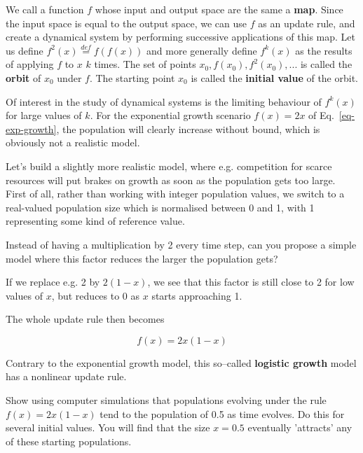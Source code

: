 
We call a function $f$ whose input and output space are the same a \textbf{map}. Since the input space is equal to the output space, we can use $f$ as an update rule, and create a dynamical system by performing successive applications of this map. Let us define $f^2(x) \stackrel{def}{=} f(f(x))$ and more generally define $f^k(x)$ as the results of applying $f$ to $x$ $k$ times. \noindent{} The set of points ${x_0, f(x_0), f^2(x_0), ...}$ is called the \textbf{orbit} of $x_0$ under $f$. The starting point $x_0$ is called the \textbf{initial value} of the orbit.

Of interest in the study of dynamical systems is the limiting behaviour of $f^k(x)$ for large values of $k$. For the exponential growth scenario $f(x)=2x$ of Eq.~\ref{eq-exp-growth}, the population will clearly increase without bound, which is obviously not a realistic model.

Let's build a slightly more realistic model, where e.g. competition for scarce resources will put brakes on growth as soon as the population gets too large. First of all, rather than working with integer population values, we switch to a real-valued population size which is normalised between 0 and 1, with 1 representing some kind of reference value. 

\begin{cue}
Instead of having a multiplication by 2 every time step, can you propose a simple model where this factor reduces the larger the population gets? 
\end{cue}

If we replace e.g. 2 by $2(1-x)$, we see that this factor is still close to 2 for low values of $x$, but reduces to 0 as $x$ starts approaching 1.

The whole update rule then becomes

\begin{equation}
f(x) = 2 x (1-x) \label{eq-logistic-growth}
\end{equation} 

Contrary to the exponential growth model, this so--called \textbf{logistic growth} model has a nonlinear update rule.

\begin{exer}
Show using computer simulations that populations evolving under the rule $f(x) = 2 x (1-x)$ tend to the population of 0.5 as time evolves. Do this for several initial values. You will find that the size $x=0.5$ eventually 'attracts' any of these starting populations.
\end{exer}

